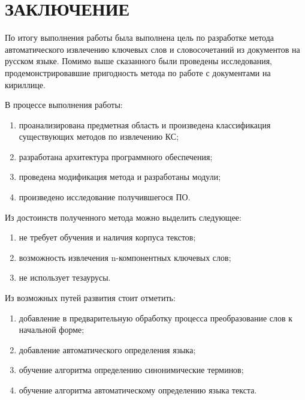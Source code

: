 \chapter*{ЗАКЛЮЧЕНИЕ}
По итогу выполнения работы была выполнена цель по разработке метода автоматического извлечению ключевых слов и словосочетаний из документов на русском языке.
Помимо выше сказанного были проведены исследования, продемонстрировавшие пригодность метода по работе с документами на кириллице.

В процессе выполнения работы:
\begin{enumerate}
	\item проанализирована предметная область и произведена классификация существующих методов по извлечению КС;
	\item разработана архитектура программного обеспечения;
	\item проведена модификация метода и разработаны модули;
	\item произведено исследование получившегося ПО.
\end{enumerate}

Из достоинств полученного метода можно выделить следующее:
\begin{enumerate}
	\item не требует обучения и наличия корпуса текстов;
	\item возможность извлечения n-компонентных ключевых слов;
	\item не использует тезаурусы. 
\end{enumerate}

Из возможных путей развития стоит отметить:
\begin{enumerate}
	\item добавление в предварительную обработку процесса преобразование слов к начальной форме;
	\item добавление автоматического определения языка;
	\item обучение алгоритма определению синонимические терминов;
	\item обучение алгоритма автоматическому определению языка текста.
\end{enumerate}